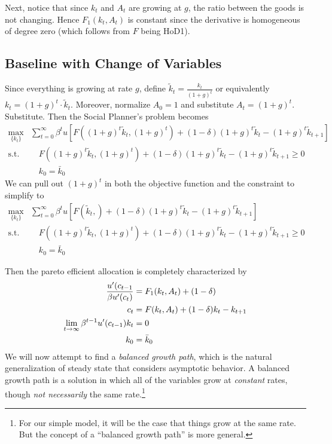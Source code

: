 \documentclass[12pt]{article}
\theoremstyle{plain}
\theoremstyle{definition}
\theoremstyle{remark}
\newcommand{\limt}{\lim_{t\rightarrow\infty}}
\newcommand{\sumtinfz}{\sum^\infty_{t=0}}
\begin{document}
Next, notice that since $k_t$ and $A_t$ are growing at $g$, the ratio
between the goods is not changing. Hence $F_1(k_t,A_t)$ is constant
since the derivative is homogeneous of degree zero (which follows from
$F$ being HoD1).

\subsection{Baseline with Change of Variables}

Since everything is growing at rate $g$, define
$\tilde{k}_t = \frac{k_t}{(1+g)^t}$ or equivalently
$k_t=(1+g)^t\cdot \tilde{k}_t$. Moreover, normalize $A_0=1$ and
substitute $A_t=(1+g)^t$. Substitute. Then the Social Planner's problem
becomes
\begin{align*}
  \max_{\{k_t\}}
    &\sumtinfz \beta^t u\left[F\left((1+g)^t\tilde{k}_t,(1+g)^{t}\right)
      + (1-\delta) (1+g)^t\tilde{k}_t - (1+g)^t\tilde{k}_{t+1}\right] \\
    \text{s.t.} &\quad
    F((1+g)^t\tilde{k}_t,(1+g)^t) + (1-\delta) (1+g)^t\tilde{k}_t
      - (1+g)^t\tilde{k}_{t+1}\geq 0\\
    &\quad k_0 = \bar{k}_0
\end{align*}
We can pull out $(1+g)^t$ in both the objective function and the
constraint to simplify to
\begin{align*}
  \max_{\{k_t\}}
    &\sumtinfz \beta^t u\left[F\left(\tilde{k}_t,\right)
      + (1-\delta) (1+g)^t\tilde{k}_t - (1+g)^t\tilde{k}_{t+1}\right] \\
    \text{s.t.} &\quad
    F((1+g)^t\tilde{k}_t,(1+g)^t) + (1-\delta) (1+g)^t\tilde{k}_t
      - (1+g)^t\tilde{k}_{t+1}\geq 0\\
    &\quad k_0 = \bar{k}_0
\end{align*}

Then the pareto efficient allocation is completely characterized by
\begin{align}
  \frac{u'(c_{t-1}}{\beta u'(c_{t})}
  &= F_1(k_t,A_t) + (1-\delta) \\
  c_t &= F(k_t,A_t) + (1-\delta)k_t - k_{t+1}\notag\\
  \limt \beta^{t-1}u'(c_{t-1}) k_t &= 0 \notag\\
  k_0 &= \bar{k}_0\notag
\end{align}
We will now attempt to find a \emph{balanced growth path}, which is the
natural generalization of steady state that considers asymptotic
behavior. A balanced growth path is a solution in which all of the
variables grow at \emph{constant} rates, though \emph{not necessarily}
the same rate.\footnote{%
  For our simple model, it will be the case that things grow at the same
  rate. But the concept of a ``balanced growth path'' is more general.
}
\end{document}
